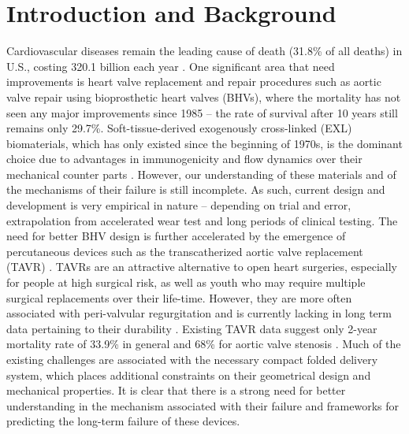\section{Introduction and Background}

    Cardiovascular diseases remain the leading cause of death (31.8\% of all deaths) in U.S., costing 320.1 billion each year \cite{mozaffarian_heart_2016}. One significant area that need improvements is heart valve replacement and repair procedures such as aortic valve repair using bioprosthetic heart valves (BHVs), where the mortality has not seen any major improvements since 1985 – the rate of survival after 10 years still remains only 29.7\%. Soft-tissue-derived exogenously cross-linked (EXL) biomaterials, which has only existed since the beginning of 1970s, is the dominant choice due to advantages in immunogenicity and flow dynamics over their mechanical counter parts 
    \cite{starr_artificial_2007}. However, our understanding of these materials and of the mechanisms of their failure is still incomplete. As such, current design and development is very empirical in nature – depending on trial and error, extrapolation from accelerated wear test and long periods of clinical testing. The need for better BHV design is further accelerated by the emergence of percutaneous devices such as the transcatherized aortic valve replacement (TAVR) \cite{bonow_accaha_2006}\cite{guidoin_marvel_2010}. TAVRs are an attractive alternative to open heart surgeries, especially for people at high surgical risk, as well as youth who may require multiple surgical replacements over their life-time. However, they are more often associated with peri-valvular regurgitation and is currently lacking in long term data pertaining to their durability \cite{guidoin_marvel_2010}. Existing TAVR data suggest only 2-year mortality rate of 33.9\% 
    \cite{kodali_two_2012} in general and 68\%
    for aortic valve stenosis \cite{makkar_transcatheter_2012}. Much of the existing challenges are associated with the necessary compact folded delivery system, which places additional constraints on their geometrical design and mechanical properties. It is clear that there is a strong need for better understanding in the mechanism associated with their failure and frameworks for predicting the long-term failure of these devices.
        
    

    
    
    
    
    
    


